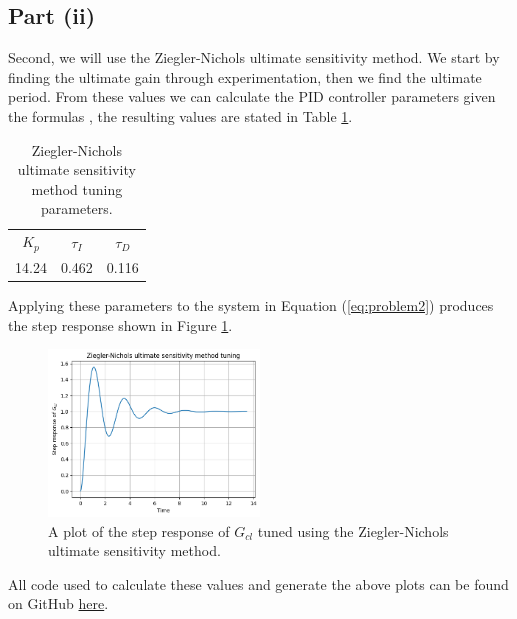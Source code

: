 \documentclass[10pt,a4paper]{article}
\begin{document}
    \subsection{Part (ii)}
        Second, we will use the Ziegler-Nichols ultimate sensitivity method. We start by finding the ultimate gain through experimentation, then we find the ultimate period. From these values we can calculate the PID controller parameters given the formulas \cite[][Table 10.3]{sopaskis_2023_control}, the resulting values are stated in Table \ref{tb:znu_params}.
        \begin{table}[h]
            \centering
            \begin{tabular}{ c | c | c }
                $K_p$ & $\tau_I$ & $\tau_D$ \\
                14.24 & 0.462    & 0.116
            \end{tabular}
            \caption{Ziegler-Nichols ultimate sensitivity method tuning parameters.}
            \label{tb:znu_params}
        \end{table}
        Applying these parameters to the system in Equation (\ref{eq:problem2}) produces the step response shown in Figure \ref{fig:znu_gcl}.
        \begin{figure}[h]
            \centering
            \includegraphics[width=0.5\textwidth]{znu_Gcl.png}
            \caption{A plot of the step response of $G_{cl}$ tuned using the Ziegler-Nichols ultimate sensitivity method.}
            \label{fig:znu_gcl}
        \end{figure}
        All code used to calculate these values and generate the above plots can be found on GitHub \href{https://github.com/DavesUnderscoreTreehouse/ELE2038_H4}{here}.
\end{document}

